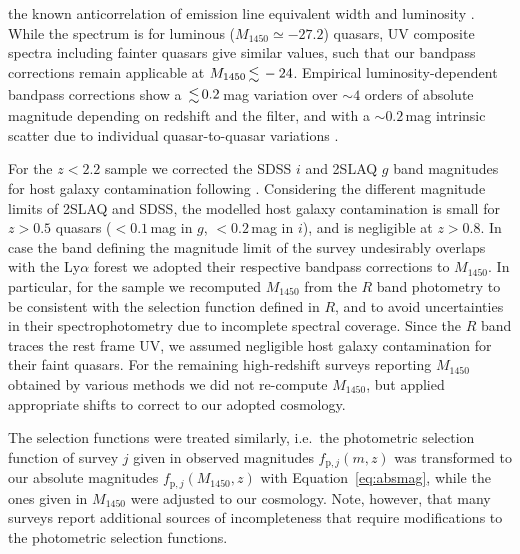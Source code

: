 \documentclass[fleqn,usenatbib]{mnras}
\begin{document}
the known anticorrelation of emission line equivalent width and
luminosity \citep{1977ApJ...214..679B}.  While the
\citet{2015MNRAS.449.4204L} spectrum is for luminous ($M_{1450}\simeq
-27.2$) quasars, UV composite spectra including fainter quasars
\citep{2002ApJ...565..773T, 2012ApJ...752..162S, 2014ApJ...794...75S}
give similar values, such that our bandpass corrections remain
applicable at $M_{1450}\la -24$. Empirical luminosity-dependent
bandpass corrections show a $\la 0.2$\,mag variation over $\sim 4$
orders of absolute magnitude depending on redshift and the filter, and
with a $\sim 0.2$\,mag intrinsic scatter due to individual quasar-to-quasar
variations \citep{2013ApJ...773...14R, 2013ApJ...768..105M,
  2013A&A...551A..29P}.


For the $z<2.2$ sample we corrected the SDSS $i$ and 2SLAQ $g$ band
magnitudes for host galaxy contamination following
\citet{2009MNRAS.392...19C}. Considering the different magnitude
limits of 2SLAQ and SDSS, the modelled host galaxy contamination is
small for $z>0.5$ quasars ($<0.1$\,mag in $g$, $<0.2$\,mag in $i$),
and is negligible at $z>0.8$.  In case the band defining the magnitude
limit of the survey undesirably overlaps with the Ly$\alpha$ forest
\citep{2010ApJ...710.1498G, 2011ApJ...728L..26G, 2013ApJ...768..105M}
we adopted their respective bandpass corrections to $M_{1450}$. In
particular, for the \citet{2010ApJ...710.1498G, 2011ApJ...728L..26G}
sample we recomputed $M_{1450}$ from the $R$ band photometry to be
consistent with the selection function defined in $R$, and to avoid
uncertainties in their spectrophotometry due to incomplete spectral
coverage. Since the \citet{2010ApJ...710.1498G, 2011ApJ...728L..26G}
$R$ band traces the rest frame UV, we assumed negligible host galaxy
contamination for their faint quasars. For the remaining high-redshift
surveys reporting $M_{1450}$ obtained by various methods
\citep{2010AJ....139..906W, 2011Natur.474..616M, 2015ApJ...798...28K,
  2015ApJ...801L..11V, 2016ApJ...829...33Y, 2016ApJ...833..222J,
  2018Natur.553..473B} we did not re-compute $M_{1450}$, but applied
appropriate shifts to correct to our adopted cosmology.

The selection functions were treated similarly, i.e.\ the photometric
selection function of survey $j$ given in observed magnitudes
$f_{\mathrm{p},j}\left(m,z\right)$ \citep{2006AJ....131.2766R,
  2009MNRAS.392...19C, 2010ApJ...710.1498G, 2013ApJ...773...14R} was
transformed to our absolute magnitudes
$f_{\mathrm{p},j}\left(M_{1450},z\right)$ with
Equation~\ref{eq:absmag}, while the ones given in $M_{1450}$ were
adjusted to our cosmology. Note, however, that many surveys report
additional sources of incompleteness that require modifications to the
photometric selection functions.
\end{document}
